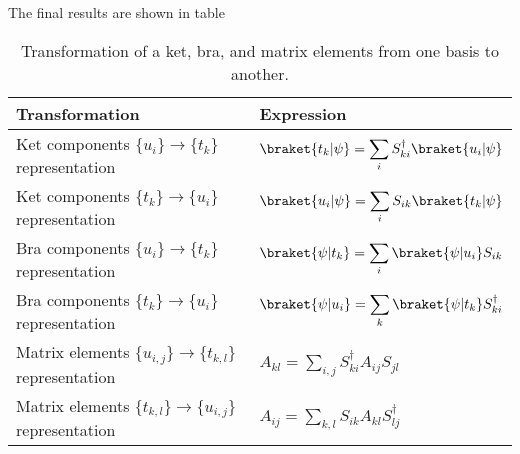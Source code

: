 The final results are shown in table 
\begin{table}[h!]
    \centering
    \renewcommand{\arraystretch}{1.5}
    \caption{Transformation of a ket, bra, and matrix elements from one basis to another.}
    \begin{tabular}{l|l}
        Transformation&Expression\\
        \hline
        Ket components $\{u_i\}\longrightarrow\{t_k\}$ representation&$\braket{t_k|\psi}=\displaystyle\sum_iS^\dagger_{ki}\braket{u_i|\psi}$\\
        Ket components $\{t_k\}\longrightarrow\{u_i\}$ representation&$\braket{u_i|\psi}=\displaystyle\sum_iS_{ik}\braket{t_k|\psi}$\\
        Bra components $\{u_i\}\longrightarrow\{t_k\}$ representation&$\braket{\psi|t_k}=\displaystyle\sum_i\braket{\psi|u_i}S_{ik}$\\
        Bra components $\{t_k\}\longrightarrow\{u_i\}$ representation&$\braket{\psi|u_i}=\displaystyle\sum_k\braket{\psi|t_k}S^\dagger_{ki}$\\
        Matrix elements $\{u_{i,j}\}\longrightarrow\{t_{k,l}\}$ representation&$A_{kl}=\displaystyle\sum_{i,j}S^\dagger_{ki}A_{ij}S_{jl}$\\
        Matrix elements $\{t_{k,l}\}\longrightarrow\{u_{i,j}\}$ representation&$A_{ij}=\displaystyle\sum_{k,l}S_{ik}A_{kl}S^\dagger_{lj}$
    \end{tabular}
\end{table}
